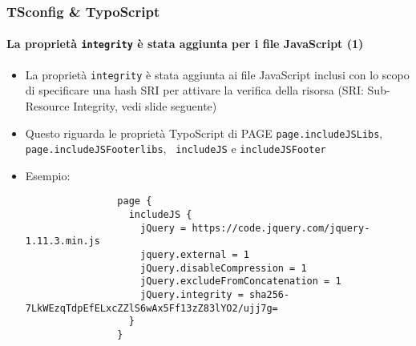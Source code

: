 \begin{frame}[fragile]
	\frametitle{TSconfig \& TypoScript}
	\framesubtitle{La proprietà \texttt{integrity} è stata aggiunta per i file JavaScript (1)}

	\lstset{basicstyle=\tiny\ttfamily}

	\begin{itemize}

		\item La proprietà \texttt{integrity} è stata aggiunta ai file JavaScript inclusi con
			lo scopo di specificare una hash SRI per attivare la verifica della risorsa\newline
			(SRI: Sub-Resource Integrity, vedi slide seguente)

		\item Questo riguarda le proprietà TypoScript di PAGE \texttt{page.includeJSLibs},
			\texttt{page.includeJSFooterlibs}, \texttt{ includeJS} e
			\texttt{includeJSFooter}

		\item Esempio:

			\begin{lstlisting}
				page {
				  includeJS {
				    jQuery = https://code.jquery.com/jquery-1.11.3.min.js
				    jquery.external = 1
				    jQuery.disableCompression = 1
				    jQuery.excludeFromConcatenation = 1
				    jQuery.integrity = sha256-7LkWEzqTdpEfELxcZZlS6wAx5Ff13zZ83lYO2/ujj7g=
				  }
				}
			\end{lstlisting}

	\end{itemize}

\end{frame}


